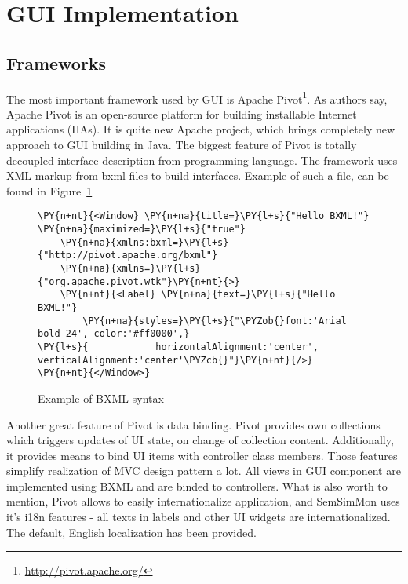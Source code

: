 \section{GUI Implementation}

\subsection{Frameworks}

The most important framework used by GUI is Apache Pivot\footnote{\url{http://pivot.apache.org/}}. As authors say,
Apache Pivot is an open-source platform for building installable Internet applications (IIAs). It is quite new Apache
project, which brings completely new approach to GUI building in Java. The biggest feature of Pivot is totally
decoupled interface description from programming language. The framework uses XML markup from bxml files to build
interfaces. Example of such a file, can be found in Figure~\ref{fig:bxml_example}
 
\begin{figure}[ht]
  \centering
    
\begin{Verbatim}[commandchars=\\\{\},frame=single,framerule=0.2pt]                                                     
\PY{n+nt}{<Window} \PY{n+na}{title=}\PY{l+s}{"Hello BXML!"} \PY{n+na}{maximized=}\PY{l+s}{"true"}                      
    \PY{n+na}{xmlns:bxml=}\PY{l+s}{"http://pivot.apache.org/bxml"}                                                      
    \PY{n+na}{xmlns=}\PY{l+s}{"org.apache.pivot.wtk"}\PY{n+nt}{>}                                                       
    \PY{n+nt}{<Label} \PY{n+na}{text=}\PY{l+s}{"Hello BXML!"}                                                           
        \PY{n+na}{styles=}\PY{l+s}{"\PYZob{}font:'Arial bold 24', color:'#ff0000',}                                     
\PY{l+s}{            horizontalAlignment:'center', verticalAlignment:'center'\PYZcb{}"}\PY{n+nt}{/>}                    
\PY{n+nt}{</Window>}                                                                                                    
\end{Verbatim} 
  \caption{Example of BXML syntax}
  \label{fig:bxml_example}
\end{figure}

Another great feature of Pivot is data binding. Pivot provides own collections which triggers updates of UI state, on
change of collection content. Additionally, it provides means to bind UI items with controller class members. Those
features simplify realization of MVC design pattern a lot. All views in GUI component are implemented using BXML and are
binded to controllers. What is also worth to mention, Pivot allows to easily internationalize application, and
SemSimMon uses it's i18n features - all texts in labels and other UI widgets are internationalized. The default,
English localization has been provided.

